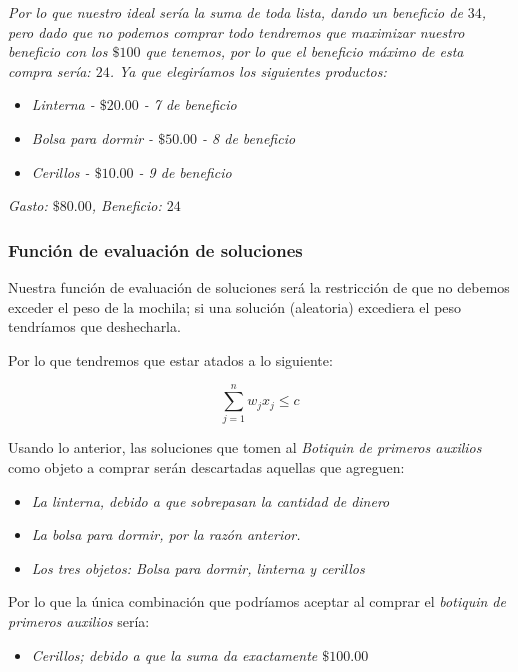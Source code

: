 \documentclass{article}
\begin{document}
\textit{Por lo que nuestro ideal sería la suma de toda lista, dando un beneficio de $34$, pero dado que no podemos comprar todo tendremos que maximizar nuestro beneficio con los $\$100$ que tenemos, por lo que el beneficio máximo de esta compra sería: $24$. Ya que elegiríamos los siguientes productos:}
\begin{itemize}
	\item \textit{Linterna - $\$20.00$ - 7 de beneficio}
	\item \textit{Bolsa para dormir - $\$50.00$ - 8 de beneficio}
	\item \textit{Cerillos - $\$10.00$ - 9 de beneficio}
\end{itemize}

\textit{Gasto: $\$80.00$, Beneficio: $24$}
\subsubsection*{Función de evaluación de soluciones}
Nuestra función de evaluación de soluciones será la restricción de que no debemos exceder el peso de la mochila; si una solución (aleatoria) excediera el peso tendríamos que deshecharla.

Por lo que tendremos que estar atados a lo siguiente:

\begin{equation*}
\sum_{j=1}^n w_{j}x_{j} \leq c
\end{equation*}

Usando lo anterior, las soluciones que tomen al \textit{Botiquin de primeros auxilios} como objeto a comprar serán descartadas aquellas que agreguen:

\begin{itemize}
	\item \textit{La linterna, debido a que sobrepasan la cantidad de dinero}
	\item \textit{La bolsa para dormir, por la razón anterior.}
	\item \textit{Los tres objetos: Bolsa para dormir, linterna y cerillos}
\end{itemize}

Por lo que la única combinación que podríamos aceptar al comprar el \textit{botiquin de primeros auxilios} sería:

\begin{itemize}
	\item \textit{Cerillos; debido a que la suma da exactamente $\$100.00$}
\end{itemize}
\end{document}
